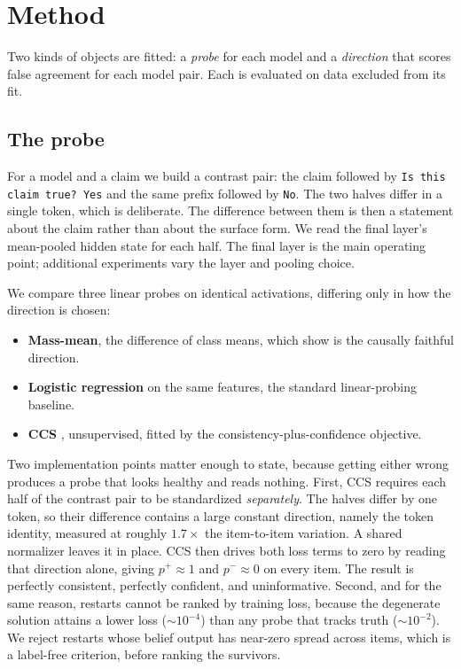 \section{Method}
\label{sec:method}

Two kinds of objects are fitted: a \emph{probe} for each model and a
\emph{direction} that scores false agreement for each model pair. Each is
evaluated on data excluded from its fit.

\subsection{The probe}
\label{sec:method:probe}

For a model and a claim we build a contrast pair: the claim followed by
\texttt{Is this claim true? Yes} and the same prefix followed by \texttt{No}. The
two halves differ in a single token, which is deliberate. The difference
between them is then a statement about the claim rather than about the surface
form. We read the final layer's mean-pooled hidden state for each half. The final layer
is the main operating point; additional experiments vary the layer and pooling
choice.

We compare three linear probes on identical activations, differing only in how
the direction is chosen:

\begin{itemize}
\itemsep0em
\item \textbf{Mass-mean}, the difference of class means, which
  \citet{marks2024geometry} show is the causally faithful direction.
\item \textbf{Logistic regression} on the same features, the standard
  linear-probing baseline.
\item \textbf{CCS} \citep{burns2023ccs}, unsupervised, fitted by the
  consistency-plus-confidence objective.
\end{itemize}

Two implementation points matter enough to state, because getting either wrong
produces a probe that looks healthy and reads nothing. First, CCS requires each
half of the contrast pair to be standardized \emph{separately}. The halves differ
by one token, so their difference contains a large constant direction, namely
the token identity, measured at roughly $1.7\times$ the item-to-item variation.
A shared normalizer leaves it in place. CCS then drives both loss terms to zero by
reading that direction alone, giving $p^+ \approx 1$ and $p^- \approx 0$ on
every item. The result is perfectly consistent, perfectly confident, and
uninformative. Second, and for the same reason, restarts cannot be ranked by
training loss, because the
degenerate solution attains a lower loss ($\sim\!10^{-4}$) than any probe that
tracks truth ($\sim\!10^{-2}$). We reject restarts whose belief output has
near-zero spread across items, which is a label-free criterion, before ranking the
survivors.

